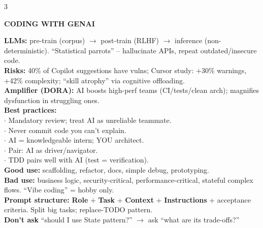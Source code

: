 \documentclass[10pt,letterpaper]{article}
\newenvironment{topic}[1]{%
  \par\addvspace{1.5pt}%
  \noindent\colorbox{hdrBG}{%
    \begin{minipage}{\dimexpr\linewidth-2\fboxsep\relax}%
      \centering\bfseries\sffamily\fontsize{6pt}{7pt}\selectfont\color{hdrFG}\MakeUppercase{#1}%
    \end{minipage}%
  }\par\nobreak\vskip0.5pt%
  \begingroup\setlength{\leftskip}{0pt}\setlength{\rightskip}{0pt}%
}{%
  \endgroup\par\addvspace{0.5pt}%
}
\newcommand{\hd}[1]{\textcolor{accent}{\textbf{#1}}}
\begin{document}
\begin{multicols*}{3}
\begin{topic}{Coding with GenAI}
\hd{LLMs:} pre-train (corpus) $\to$ post-train (RLHF) $\to$ inference (non-deterministic). ``Statistical parrots'' -- hallucinate APIs, repeat outdated/insecure code.\\
\hd{Risks:} 40\% of Copilot suggestions have vulns; Cursor study: +30\% warnings, +42\% complexity; ``skill atrophy'' via cognitive offloading.\\
\hd{Amplifier (DORA):} AI boosts high-perf teams (CI/tests/clean arch); magnifies dysfunction in struggling ones.\\
\hd{Best practices:}\\
$\cdot$ Mandatory review; treat AI as unreliable teammate.\\
$\cdot$ Never commit code you can't explain.\\
$\cdot$ AI = knowledgeable intern; YOU architect.\\
$\cdot$ Pair: AI as driver/navigator.\\
$\cdot$ TDD pairs well with AI (test = verification).\\
\hd{Good use:} scaffolding, refactor, docs, simple debug, prototyping.\\
\hd{Bad use:} business logic, security-critical, performance-critical, stateful complex flows. ``Vibe coding'' = hobby only.\\
\hd{Prompt structure:} \textbf{Role} + \textbf{Task} + \textbf{Context} + \textbf{Instructions} + acceptance criteria. Split big tasks; replace-TODO pattern.\\
\hd{Don't ask} ``should I use State pattern?'' $\to$ ask ``what are its trade-offs?''
\end{topic}


\end{multicols*}
\end{document}
